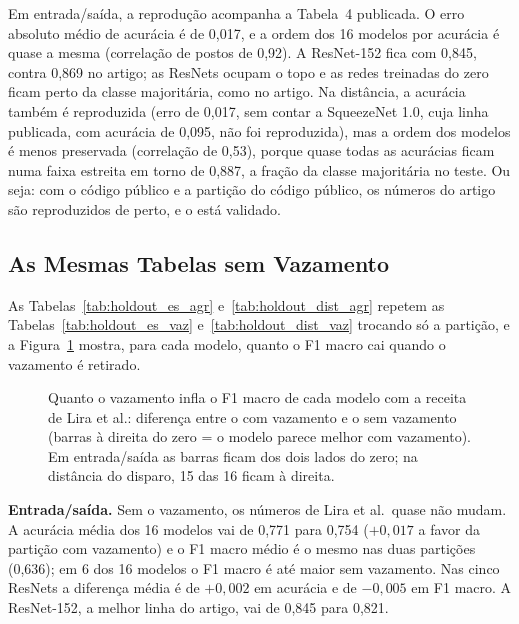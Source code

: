 



Em entrada/saída, a reprodução acompanha a Tabela~4 publicada. O erro absoluto médio de acurácia é de 0,017, e a ordem dos 16 modelos por acurácia é quase a mesma (correlação de postos de 0,92). A ResNet-152 fica com 0,845, contra 0,869 no artigo; as ResNets ocupam o topo e as redes treinadas do zero ficam perto da classe majoritária, como no artigo. Na distância, a acurácia também é reproduzida (erro de 0,017, sem contar a SqueezeNet 1.0, cuja linha publicada, com acurácia de 0,095, não foi reproduzida), mas a ordem dos modelos é menos preservada (correlação de 0,53), porque quase todas as acurácias ficam numa faixa estreita em torno de 0,887, a fração da classe majoritária no teste. Ou seja: com o código público e a partição do código público, os números do artigo são reproduzidos de perto, e o  está validado.



\subsection{As Mesmas Tabelas sem Vazamento}
\label{sec:res_holdout_agr}

As Tabelas~\ref{tab:holdout_es_agr} e~\ref{tab:holdout_dist_agr} repetem as Tabelas~\ref{tab:holdout_es_vaz} e~\ref{tab:holdout_dist_vaz} trocando só a partição, e a Figura~\ref{fig:holdout_delta} mostra, para cada modelo, quanto o F1 macro cai quando o vazamento é retirado.





\begin{figure}[!htbp]
\centering

\caption{Quanto o vazamento infla o F1 macro de cada modelo com a receita de Lira et al.: diferença entre o  com vazamento e o  sem vazamento (barras à direita do zero = o modelo parece melhor com vazamento). Em entrada/saída as barras ficam dos dois lados do zero; na distância do disparo, 15 das 16 ficam à direita.}
\label{fig:holdout_delta}
\end{figure}

\textbf{Entrada/saída.} Sem o vazamento, os números de Lira et al.\ quase não mudam. A acurácia média dos 16 modelos vai de 0,771 para 0,754 ($+0{,}017$ a favor da partição com vazamento) e o F1 macro médio é o mesmo nas duas partições (0,636); em 6 dos 16 modelos o F1 macro é até maior sem vazamento. Nas cinco ResNets a diferença média é de $+0{,}002$ em acurácia e de $-0{,}005$ em F1 macro. A ResNet-152, a melhor linha do artigo, vai de 0,845 para 0,821.


